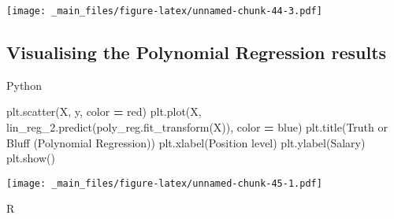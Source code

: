 \documentclass[
]{book}
\newenvironment{Shaded}{\begin{snugshade}}{\end{snugshade}}
\newcommand{\AttributeTok}[1]{\textcolor[rgb]{0.77,0.63,0.00}{#1}}
\newcommand{\CommentTok}[1]{\textcolor[rgb]{0.56,0.35,0.01}{\textit{#1}}}
\newcommand{\FunctionTok}[1]{\textcolor[rgb]{0.00,0.00,0.00}{#1}}
\newcommand{\NormalTok}[1]{#1}
\newcommand{\OperatorTok}[1]{\textcolor[rgb]{0.81,0.36,0.00}{\textbf{#1}}}
\newcommand{\SpecialCharTok}[1]{\textcolor[rgb]{0.00,0.00,0.00}{#1}}
\newcommand{\StringTok}[1]{\textcolor[rgb]{0.31,0.60,0.02}{#1}}
\theoremstyle{definition}
\theoremstyle{definition}
\theoremstyle{definition}
\theoremstyle{definition}
\theoremstyle{remark}
\begin{document}
\texttt{[image: \_main\_files/figure-latex/unnamed-chunk-44-3.pdf]}

\hypertarget{visualising-the-polynomial-regression-results}{%
\subsection{Visualising the Polynomial Regression results}\label{visualising-the-polynomial-regression-results}}

Python

\begin{Shaded}
\begin{Highlighting}[]
\NormalTok{plt.scatter(X, y, color }\OperatorTok{=} \StringTok{\textquotesingle{}red\textquotesingle{}}\NormalTok{)}
\NormalTok{plt.plot(X, lin\_reg\_2.predict(poly\_reg.fit\_transform(X)), color }\OperatorTok{=} \StringTok{\textquotesingle{}blue\textquotesingle{}}\NormalTok{)}
\NormalTok{plt.title(}\StringTok{\textquotesingle{}Truth or Bluff (Polynomial Regression)\textquotesingle{}}\NormalTok{)}
\NormalTok{plt.xlabel(}\StringTok{\textquotesingle{}Position level\textquotesingle{}}\NormalTok{)}
\NormalTok{plt.ylabel(}\StringTok{\textquotesingle{}Salary\textquotesingle{}}\NormalTok{)}
\NormalTok{plt.show()}
\end{Highlighting}
\end{Shaded}

\texttt{[image: \_main\_files/figure-latex/unnamed-chunk-45-1.pdf]}

R

\begin{Shaded}
\end{Shaded}
\end{document}
